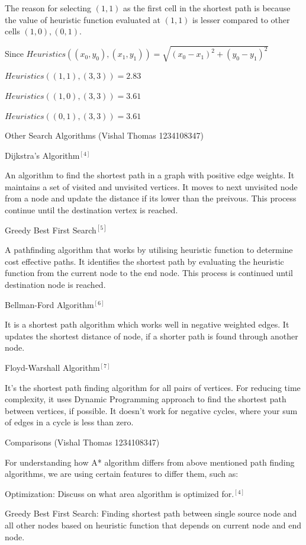 \documentclass[11pt]{article}
\begin{document}
The reason for selecting \((1,1)\) as the first cell in the shortest
path is because the value of heuristic function evaluated at \((1,1)\)
is lesser compared to other cells \((1,0), (0,1)\).

Since
\(Heuristics((x_0, y_0), (x_1, y_1)) = \sqrt{(x_0 - x_1)^2+(y_0 - y_1)^2}\)

\(Heuristics((1,1),(3,3)) = 2.83\)

\(Heuristics((1,0),(3,3)) = 3.61\)

\(Heuristics((0,1),(3,3)) = 3.61\)

    Other Search Algorithms (Vishal Thomas 1234108347)

Dijkstra's Algorithm\(^{[4]}\)

An algorithm to find the shortest path in a graph with positive edge
weights. It maintains a set of visited and unvisited vertices. It moves
to next unvisited node from a node and update the distance if its lower
than the preivous. This process continue until the destination vertex is
reached.

Greedy Best First Search\(^{[5]}\)

A pathfinding algorithm that works by utilising heuristic function to
determine cost effective paths. It identifies the shortest path by
evaluating the heuristic function from the current node to the end node.
This process is continued until destination node is reached.

Bellman-Ford Algorithm\(^{[6]}\)

It is a shortest path algorithm which works well in negative weighted
edges. It updates the shortest distance of node, if a shorter path is
found through another node.

Floyd-Warshall Algorithm\(^{[7]}\)

It's the shortest path finding algorithm for all pairs of vertices. For
reducing time complexity, it uses Dynamic Programming approach to find
the shortest path between vertices, if possible. It doesn't work for
negative cycles, where your sum of edges in a cycle is less than zero.

Comparisons (Vishal Thomas 1234108347)

For understanding how A* algorithm differs from above mentioned path
finding algorithms, we are using certain features to differ them, such
as:

Optimization: Discuss on what area algorithm is optimized for.\(^{[4]}\)

Greedy Best First Search: Finding shortest path between single source
node and all other nodes based on heuristic function that depends on
current node and end node.
\end{document}
